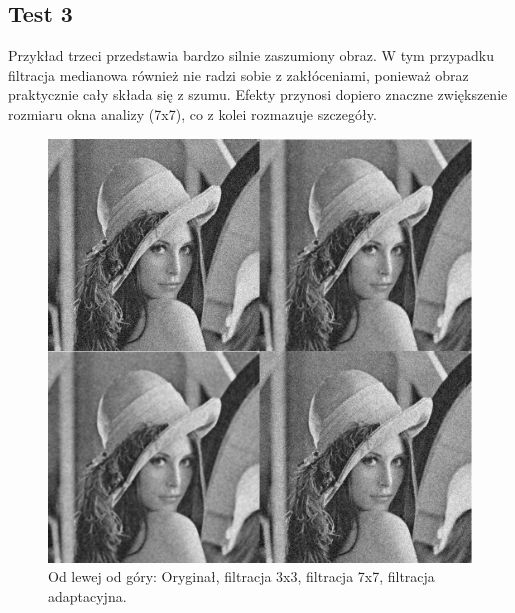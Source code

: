 \documentclass[a4paper,12pt,oneside,notitlepage,onecolumn]{article}
\begin{document}
\subsection{Test 3}
Przykład trzeci przedstawia bardzo silnie zaszumiony obraz.
W tym przypadku filtracja medianowa również nie radzi sobie z zakłóceniami, ponieważ obraz praktycznie cały składa się z szumu.
Efekty przynosi dopiero znaczne zwiększenie rozmiaru okna analizy (7x7), co z kolei rozmazuje szczegóły.
\begin{figure}
\centering
\includegraphics[width=13cm]{test3_final.png}
\caption{Od lewej od góry: Oryginał, filtracja 3x3, filtracja 7x7, filtracja adaptacyjna.}
\end{figure}
\end{document}
